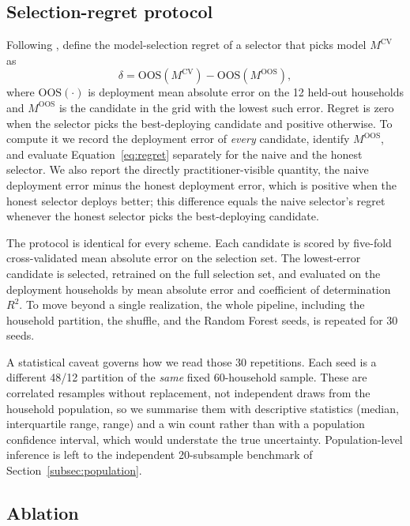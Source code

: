 \documentclass[forecasting,article,submit,oneauthor,pdftex]{Definitions/mdpi}
\begin{document}
\subsection{Selection-regret protocol}

Following \citet{teodorescu2025regret}, define the model-selection regret of a
selector that picks model $M^{\mathrm{CV}}$ as
\begin{equation}
  \delta = \mathrm{OOS}\!\left(M^{\mathrm{CV}}\right) - \mathrm{OOS}\!\left(M^{\mathrm{OOS}}\right),
  \label{eq:regret}
\end{equation}
where $\mathrm{OOS}(\cdot)$ is deployment mean absolute error on the 12 held-out
households and $M^{\mathrm{OOS}}$ is the candidate in the grid with the lowest
such error. Regret is zero when the selector picks the best-deploying candidate
and positive otherwise. To compute it we record the deployment error of
\emph{every} candidate, identify $M^{\mathrm{OOS}}$, and evaluate
Equation~\eqref{eq:regret} separately for the naive and the honest selector. We
also report the directly practitioner-visible quantity, the naive deployment
error minus the honest deployment error, which is positive when the honest
selector deploys better; this difference equals the naive selector's regret
whenever the honest selector picks the best-deploying candidate.

The protocol is identical for every scheme. Each candidate is scored by five-fold
cross-validated mean absolute error on the selection set. The lowest-error
candidate is selected, retrained on the full selection set, and evaluated on the
deployment households by mean absolute error and coefficient of determination
$R^2$. To move beyond a single realization, the whole pipeline, including the
household partition, the shuffle, and the Random Forest seeds, is repeated for 30
seeds.

A statistical caveat governs how we read those 30 repetitions. Each seed is a
different 48/12 partition of the \emph{same} fixed 60-household sample. These are
correlated resamples without replacement, not independent draws from the
household population, so we summarise them with descriptive statistics (median,
interquartile range, range) and a win count rather than with a population
confidence interval, which would understate the true uncertainty. Population-level
inference is left to the independent 20-subsample benchmark of
Section~\ref{subsec:population}.

\subsection{Ablation}
\end{document}
